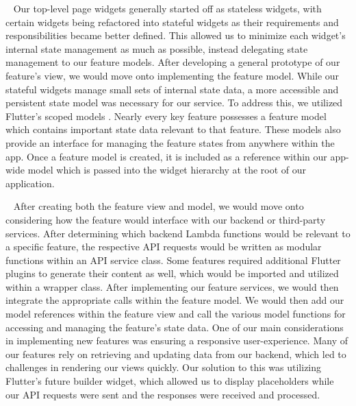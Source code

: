 \documentclass[10pt, a4paper]{article}
\begin{document}
\par ~ Our top-level page widgets generally started off as stateless widgets, with certain widgets being refactored into stateful widgets as their requirements and responsibilities became better defined. This allowed us to minimize each widget's internal state management as much as possible, instead delegating state management to our feature models. After developing a general prototype of our feature's view, we would move onto implementing the feature model. While our stateful widgets manage small sets of internal state data, a more accessible and persistent state model was necessary for our service. To address this, we utilized Flutter's scoped models \cite{one}. Nearly every key feature possesses a feature model which contains important state data relevant to that feature. These models also provide an interface for managing the feature states from anywhere within the app. Once a feature model is created, it is included as a reference within our app-wide model which is passed into the widget hierarchy at the root of our application.

\par ~ After creating both the feature view and model, we would move onto considering how the feature would interface with our backend or third-party services. After determining which backend Lambda functions would be relevant to a specific feature, the respective API requests would be written as modular functions within an API service class. Some features required additional Flutter plugins to generate their content as well, which would be imported and utilized within a wrapper class. After implementing our feature services, we would then integrate the appropriate calls within the feature model. We would then add our model references within the feature view and call the various model functions for accessing and managing the feature's state data. One of our main considerations in implementing new features was ensuring a responsive user-experience. Many of our features rely on retrieving and updating data from our backend, which led to challenges in rendering our views quickly. Our solution to this was utilizing Flutter's future builder widget, which allowed us to display placeholders while our API requests were sent and the responses were received and processed.
\end{document}
